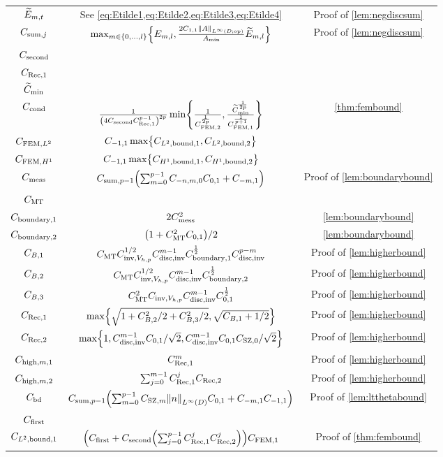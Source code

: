 \begin{longtabu}{ccc}
  $\widetilde{E}_{m,t}$ & See \cref{eq:Etilde1,eq:Etilde2,eq:Etilde3,eq:Etilde4} & Proof of \cref{lem:negdiscsum}\\
  $C_{\mathrm{sum},j}$ &$\max_{m \in \set{0,\ldots,l}}\set{\Efn{m,l},\frac{2\Cfn{1,1}\NLiDop{A}}{\Amin}\Etildefn{m,l}}$ & Proof of \cref{lem:negdiscsum}\\
  $C_{\mathrm{second}}$ &&\\
  $C_{\mathrm{Rec},1}$&&\\
  $\widetilde{C}_{\min}$&&\\
  $C_{\mathrm{cond}}$ & $\frac1{\mleft(4\Csecond \CReco^{p-1}\mright)^{2p}} \min\set{\frac1{\CFEMttilde^{\frac1{2p}}},\frac{\Ctildemin^{\frac1{2p}}}{\CFEMotilde^{\frac1{p+1}}}}$ & \cref{thm:fembound}\\
  $C_{\mathrm{FEM},L^{2}}$ &$\Cfn{-1,1} \max\set{\CLtboundo,\CLtboundt}$&\\
  $C_{\mathrm{FEM},H^{1}}$ &$\Cfn{-1,1}\max\set{\CHoboundo,\CHoboundt}$&\\
  $C_{\mathrm{mess}}$ &$\Csumpmo \mleft(\sum_{m=0}^{p-1} \Cfn{-n,m,0} \Cfn{0,1} + \Cfn{-m,1}\mright)$&Proof of \cref{lem:boundarybound}\\
  $C_{\mathrm{MT}}$ &&\\
  $C_{\mathrm{boundary},1}$ & $2C_{\mathrm{mess}}^2$ & \cref{lem:boundarybound} \\
  $C_{\mathrm{boundary},2}$ & $\mleft(1 + \CMT^2 \Cfn{0,1}\mright)/2$ & \cref{lem:boundarybound}\\
  $C_{B,1}$&$C_{\mathrm{MT}} C_{\mathrm{inv},V_{h,p}}^{1/2} C_{\mathrm{disc},\mathrm{inv}}^{m-1} C_{\mathrm{boundary},1}^{\frac{1}{2}} C_{\mathrm{disc},\mathrm{inv}}^{p-m}$&Proof of \cref{lem:higherbound}\\
  $C_{B,2}$&$C_{\mathrm{MT}} C_{\mathrm{inv},V_{h,p}}^{1/2} C_{\mathrm{disc},\mathrm{inv}}^{m-1} C_{\mathrm{boundary},2}^{\frac{1}{2}}$&Proof of \cref{lem:higherbound}\\
  $C_{B,3}$&$C_{\mathrm{MT}}^2 C_{\mathrm{inv},V_{h,p}} C_{\mathrm{disc},\mathrm{inv}}^{m-1}C_{0,1}^{\frac{1}{2}}$&Proof of \cref{lem:higherbound}\\
  $C_{\mathrm{Rec},1}$&$\max\set{\sqrt{1 + \CBt^2/2 + \CBth^2/2},\sqrt{\CBo + 1/2}}$&Proof of \cref{lem:higherbound}\\
  $C_{\mathrm{Rec},2}$&$\max\set{1,\Chinv^{m-1}\Cfn{0,1}/\sqrt{2},\Chinv^{m-1}\Cfn{0,1}\CSZfn{0}/\sqrt{2}}$&Proof of \cref{lem:higherbound}\\
  $C_{\mathrm{high},m,1}$ & $C_{\mathrm{Rec},1}^m$&Proof of \cref{lem:higherbound}\\
  $C_{\mathrm{high},m,2}$ &$\sum_{j=0}^{m-1} C_{\mathrm{Rec},1}^j C_{\mathrm{Rec},2}$&Proof of \cref{lem:higherbound}\\
  $C_{\mathrm{bd}}$ &$\Csumfn{p-1}\mleft(\sum_{m=0}^{p-1} \CSZfn{m} \NLiD{n}\Cfn{0,1} + \Cfn{-m,1}\Cfn{-1,1}\mright)$&Proof of \cref{lem:ltthetabound}\\
  $C_{\mathrm{first}}$ &&\\
  $C_{L^{2},\mathrm{bound},1}$&$\mleft(\Cfirst+ \Csecond \mleft(\sum_{j=0}^{p-1} \CReco^j \CRect^j\mright)\mright) \CFEMotilde$&Proof of \cref{thm:fembound}\\

\end{longtabu}
